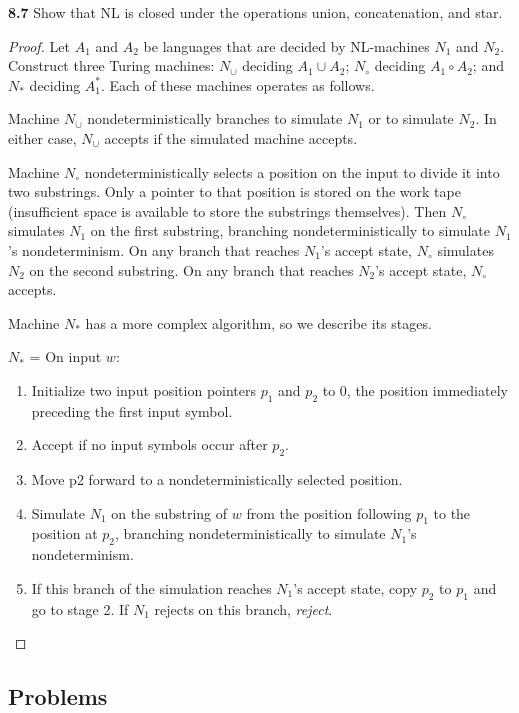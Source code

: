 \label{exe:NL_CLOSURE}
\textbf{8.7} Show that NL is closed under the operations union, concatenation, and star.

\begin{mdframed}
\begin{proof}
Let $A_1$ and $A_2$ be languages that are decided by NL-machines $N_1$ and $N_2$. Construct three Turing machines: $N_\cup$ deciding $A_1 \cup A_2$; $N_\circ$ deciding $A_1 \circ A_2$; and $N_*$ deciding $A_1^*$. Each of these machines operates as follows.

\medskip
Machine $N_\cup$ nondeterministically branches to simulate $N_1$ or to simulate $N_2$. In either case, $N_\cup$ accepts if the simulated machine accepts.

\medskip
Machine $N_\circ$ nondeterministically selects a position on the input to divide it into two substrings. Only a pointer to that position is stored on the work tape (insufficient space is available to store the substrings themselves). Then $N_\circ$ simulates $N_1$ on the first substring, branching nondeterministically to simulate $N_1$’s nondeterminism. On any branch that reaches $N_1$’s accept state, $N_\circ$ simulates $N_2$ on the second substring. On any branch that reaches $N_2$’s accept state, $N_\circ$ accepts.

\medskip
Machine $N_*$ has a more complex algorithm, so we describe its stages.

\medskip
$N_*$ = On input $w$:
\begin{enumerate}
\item Initialize two input position pointers $p_1$ and $p_2$ to 0, the position immediately preceding the first input symbol.
\item Accept if no input symbols occur after $p_2$.
\item Move p2 forward to a nondeterministically selected position.
\item Simulate $N_1$ on the substring of $w$ from the position following $p_1$ to the position at $p_2$, branching nondeterministically to simulate $N_1$’s nondeterminism.
\item If this branch of the simulation reaches $N_1$’s accept state, copy $p_2$ to $p_1$ and go to stage 2. If $N_1$ rejects on this branch, \textit{reject}.
\end{enumerate}
\end{proof}
\end{mdframed}

\subsection{Problems}


